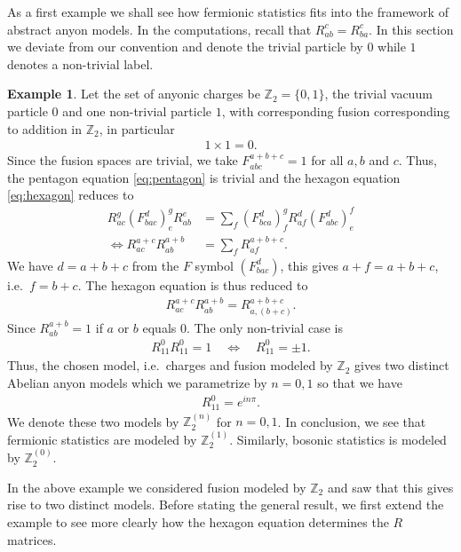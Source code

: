 \documentclass[a4paper,10pt,oneside]{book}
\theoremstyle{plain}
\theoremstyle{definition}
\newtheorem{example}{Example}[section]
\theoremstyle{remark}
\begin{document}
As a first example we shall see how fermionic statistics fits into the framework of abstract anyon models. In the computations, recall that $R_{ab}^c = R_{ba}^c$. In this section we deviate from our convention and denote the trivial particle by $0$ while $1$ denotes a non-trivial label.

\begin{example}
  Let the set of anyonic charges be $\mathbb{Z}_2 = \{0, 1\}$, the trivial vacuum particle $0$ and one non-trivial particle $1$, with corresponding fusion corresponding to addition in $\mathbb{Z}_2$, in particular
  \begin{align*}
    1 × 1 = 0.
  \end{align*}
  Since the fusion spaces are trivial, we take $F_{abc}^{a+b+c} = 1$ for all $a, b$ and $c$. Thus, the pentagon equation \cref{eq:pentagon} is trivial and the hexagon equation \cref{eq:hexagon} reduces to
  \begin{align*}
    R_{ac}^g \left(F_{bac}^d\right)^g_e R_{ab}^e &= \sum_{f} \left(F_{bca}^d\right)^g_f R_{af}^d \left(F_{abc}^d\right)^f_e \\
    \iff
    R_{ac}^{a+c} R_{ab}^{a+b} &= \sum_{f} R_{af}^{a+b+c}.
  \end{align*}
  We have $d = a + b + c$ from the $F$ symbol $\left(F_{bac}^d\right)$, this gives $a + f = a + b + c$, i.e.\ $f = b + c$. The hexagon equation is thus reduced to
  \begin{align*}
    R_{ac}^{a+c} R_{ab}^{a+b} = R_{a,(b+c)}^{a+b+c}.
  \end{align*}
  Since $R_{ab}^{a+b} = 1$ if $a$ or $b$ equals $0$. The only non-trivial case is
  \begin{align*}
    R_{11}^{0} R_{11}^{0} = 1 \quad \iff \quad R_{11}^{0} = ±1.
  \end{align*}
  Thus, the chosen model, i.e.\ charges and fusion modeled by $\mathbb{Z}_2$ gives two distinct Abelian anyon models which we parametrize by $n = 0, 1$ so that we have
  \begin{align*}
    R_{11}^0 = e^{inπ}.
  \end{align*}
  We denote these two models by $\mathbb{Z}_2^{(n)}$ for $n = 0, 1$. In conclusion, we see that fermionic statistics are modeled by $\mathbb{Z}_2^{(1)}$. Similarly, bosonic statistics is modeled by $\mathbb{Z}_2^{(0)}$.
\end{example}

In the above example we considered fusion modeled by $\mathbb{Z}_2$ and saw that this gives rise to two distinct models. Before stating the general result, we first extend the example to see more clearly how the hexagon equation determines the $R$ matrices.
\end{document}
